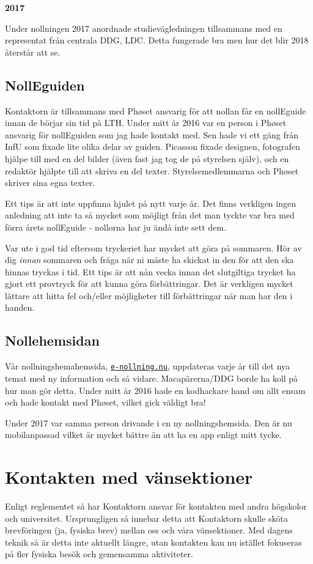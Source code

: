 \documentclass[10pt]{article}
\begin{document}
\textbf{2017}

Under nollningen 2017 anordnade studievägledningen tillsammans med en representat från centrala DDG, LDC. Detta fungerade bra men hur det blir 2018 återstår att se.
\subsection{NollEguiden}
Kontaktorn är tillsammans med Ph\o set ansvarig för att nollan får en nollEguide innan de börjar sin tid på LTH. Under mitt år 2016 var en person i Ph\o set ansvarig för nollEguiden som jag hade kontakt med. Sen hade vi ett gäng från InfU som fixade lite olika delar av guiden. Picasson fixade designen, fotografen hjälpe till med en del bilder (även fast jag tog de på styrelsen själv), och en redaktör hjälpte till att skriva en del texter. Styrelsemedlemmarna och Ph\o set skriver sina egna texter.

Ett tips är att inte uppfinna hjulet på nytt varje år. Det finns verkligen ingen anledning att inte ta så mycket som möjligt från det man tyckte var bra med förra årets nollEguide - nollorna har ju ändå inte sett dem.

Var ute i god tid eftersom tryckeriet har mycket att göra på sommaren. Hör av dig \emph{innan} sommaren och fråga när ni måste ha skickat in den för att den ska hinnas tryckas i tid. Ett tips är att nån vecka innan det slutgiltiga trycket ha gjort ett provtryck för att kunna göra förbättringar. Det är verkligen mycket lättare att hitta fel och/eller möjligheter till förbättringar när man har den i handen.

\newpage
\subsection{Nollehemsidan}
Vår nollningshemahemsida, \href{https://e-nollning.nu}{\texttt{e-nollning.nu}}, uppdateras varje år till det nya temat med ny information och så vidare. Macapärerna/DDG borde ha koll på hur man gör detta. Under mitt år 2016 hade en kodhackare hand om allt ensam och hade kontakt med Ph\o set, vilket gick väldigt bra!

Under 2017 var samma person drivande i en ny nollningshemsida. Den är nu mobilanpassad vilket är mycket bättre än att ha en app enligt mitt tycke.


\section{Kontakten med vänsektioner}
Enligt reglementet så har Kontaktorn ansvar för kontakten med andra högskolor och universitet. Ursprungligen så innebar detta att Kontaktorn skulle sköta brevföringen (ja, fysiska brev) mellan oss och våra vänsektioner. Med dagens teknik så är detta inte aktuellt längre, utan kontakten kan nu istället fokuseras på fler fysiska besök och gemensamma aktiviteter.
\end{document}
